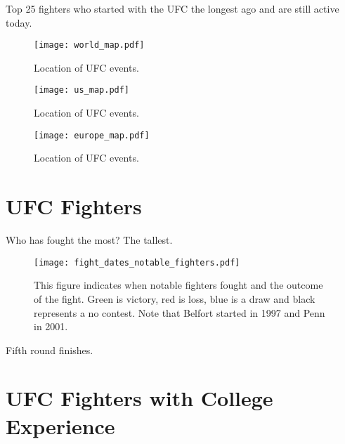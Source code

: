 \documentclass[12pt]{article}
\begin{document}
\begin{center}
\begin{table}[h]

\caption{Top 25 fighters who started with the UFC the longest ago and are still active today.}
\end{table}
\end{center}

\begin{figure}[h]
\begin{center}
\texttt{[image: world\_map.pdf]}
\caption{Location of UFC events.}
\end{center}
\end{figure}

\begin{figure}[h]
\begin{center}
\texttt{[image: us\_map.pdf]}
\caption{Location of UFC events.}
\end{center}
\end{figure}

\begin{figure}[h]
\begin{center}
\texttt{[image: europe\_map.pdf]}
\caption{Location of UFC events.}
\end{center}
\end{figure}

\section*{UFC Fighters}

Who has fought the most? The tallest.

\begin{figure}[h]
\begin{center}
\texttt{[image: fight\_dates\_notable\_fighters.pdf]}
\caption{This figure indicates when notable fighters fought and the outcome of the fight. Green is victory, red is loss, blue is a draw
and black represents a no contest. Note that Belfort started in 1997 and Penn in 2001.}
\end{center}
\end{figure}








Fifth round finishes.
\appendix


\section{UFC Fighters with College Experience}
\label{appendix_education}
\begin{center}

\end{center}

%
\end{document}
